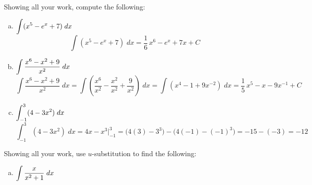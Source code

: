 \documentclass[12pt,letterpaper]{exam}
\begin{document}
\begin{questions}
 Showing all your work, compute the following: \par\vspace{0.3cm}
 	\begin{enumerate}[(a)]
	\item $\displaystyle\int (x^5 - e^x + 7) \;dx$ \vfill
		\[
		\int (x^5 - e^x + 7) \;dx= \frac{1}{6}\, x^6 - e^x + 7x + C
		\] \vfill
	\item $\displaystyle\int \dfrac{x^6 - x^2 + 9}{x^2} \;dx$ \vfill
		\[
		\int \dfrac{x^6 - x^2 + 9}{x^2} \;dx= \int \left( \dfrac{x^6}{x^2} - \dfrac{x^2}{x^2} + \dfrac{9}{x^2} \right) \;dx= \int \left( x^4 - 1 + 9x^{-2} \right) \;dx= \dfrac{1}{5}\,x^5 - x - 9x^{-1} + C
		\] \vfill
	
	\item $\displaystyle\int_{-1}^3 (4 - 3x^2) \;dx$ \vfill
		\[
		\int_{-1}^3 (4 - 3x^2) \;dx= 4x - x^3 \bigg|_{-1}^3= \big(4(3) - 3^3\big) - \big(4(-1) - (-1)^3 \big)= -15 - (-3)= -12 
		\] \vfill
	\end{enumerate}

 
 
\newpage
{} \par\vspace{0.3cm}

Showing all your work, use $u$-substitution to find the following: \par\vspace{0.3cm}
	\begin{enumerate}[(a)]
	\item $\displaystyle\int \dfrac{x}{x^2 + 1} \;dx$ \pspace
	

\end{enumerate}
\end{questions}
\end{document}
